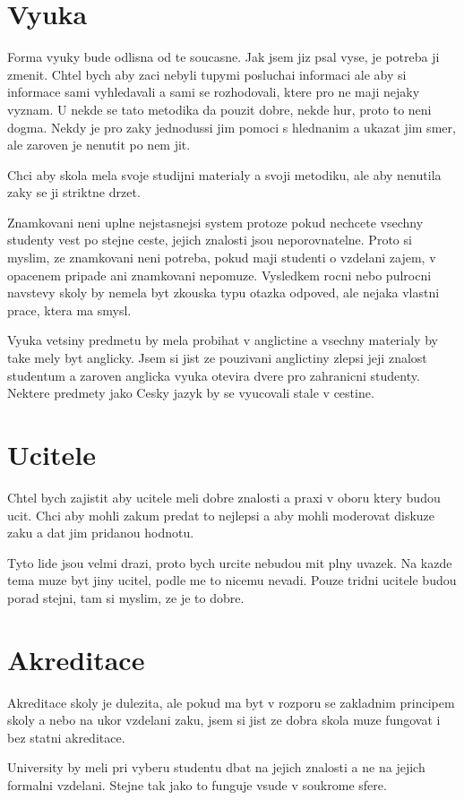 \documentclass[12pt,a4paper]{article}
\begin{document}
\section*{Vyuka}

Forma vyuky bude odlisna od te soucasne. Jak jsem jiz psal vyse, je potreba ji zmenit. Chtel bych aby zaci nebyli tupymi posluchai informaci ale aby si informace sami vyhledavali a sami se rozhodovali, ktere pro ne maji nejaky vyznam. U nekde se tato metodika da pouzit dobre, nekde hur, proto to neni dogma. Nekdy je pro zaky jednodussi jim pomoci s hlednanim a ukazat jim smer, ale zaroven je nenutit po nem jit.

Chci aby skola mela svoje studijni materialy a svoji metodiku, ale aby nenutila zaky se ji striktne drzet.

Znamkovani neni uplne nejstasnejsi system protoze pokud nechcete vsechny studenty vest po stejne ceste, jejich znalosti jsou neporovnatelne. Proto si myslim, ze znamkovani neni potreba, pokud maji studenti o vzdelani zajem, v opacenem pripade ani znamkovani nepomuze. Vysledkem rocni nebo pulrocni navstevy skoly by nemela byt zkouska typu otazka odpoved, ale nejaka vlastni prace, ktera ma smysl.

Vyuka vetsiny predmetu by mela probihat v anglictine a vsechny materialy by take mely byt anglicky. Jsem si jist ze pouzivani anglictiny zlepsi jeji znalost studentum a zaroven anglicka vyuka otevira dvere pro zahranicni studenty. Nektere predmety jako Cesky jazyk by se vyucovali stale v cestine.

\section*{Ucitele}

Chtel bych zajistit aby ucitele meli dobre znalosti a praxi v oboru ktery budou ucit. Chci aby mohli zakum predat to nejlepsi a aby mohli moderovat diskuze zaku a dat jim pridanou hodnotu.

Tyto lide jsou velmi drazi, proto bych urcite nebudou mit plny uvazek. Na kazde tema muze byt jiny ucitel, podle me to nicemu nevadi. Pouze tridni ucitele budou porad stejni, tam si myslim, ze je to dobre.


\section*{Akreditace}

Akreditace skoly je dulezita, ale pokud ma byt v rozporu se zakladnim principem skoly a nebo na ukor vzdelani zaku, jsem si jist ze dobra skola muze fungovat i bez statni akreditace.

University by meli pri vyberu studentu dbat na jejich znalosti a ne na jejich formalni vzdelani. Stejne tak jako to funguje vsude v soukrome sfere.
\end{document}
